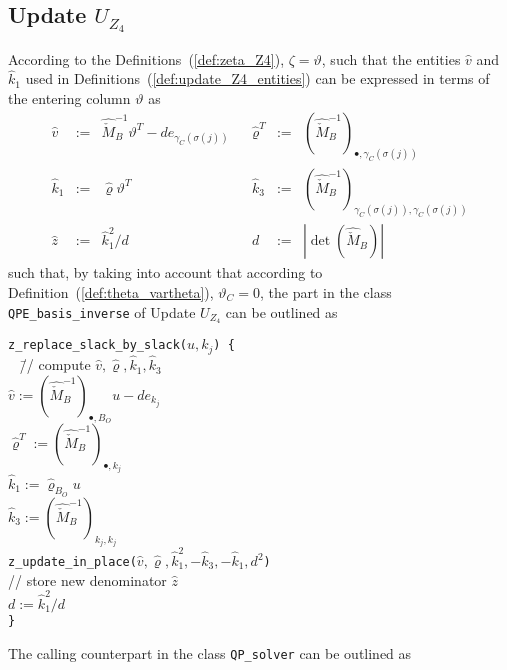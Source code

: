 \documentclass[a4paper]{article}
\begin{document}
\subsection{Update $U_{Z_{4}}$}
According to the Definitions~(\ref{def:zeta_Z4}),
$\zeta=\vartheta$, such that the entities $\hat{v}$ and $\hat{k}_{1}$ used
in Definitions~(\ref{def:update_Z4_entities}) can be expressed in terms
of the entering column $\vartheta$ as
\begin{equation}
\label{def:update_Z4_entities_prep}
\begin{array}{rclcrcl}
\hat{v}
&:=&
\hat{\check{M}}_{B}^{-1}\vartheta^{T} -de_{\gamma_{C}(\sigma(j))}
&&
\hat{\varrho}^{T}
&:=&
\left(\hat{\check{M}}_{B}^{-1}\right)_{\bullet, \gamma_{C}(\sigma(j))}
\\
\hat{k}_{1}
&:=&
\hat{\varrho}\vartheta^{T}
&&
\hat{k}_{3}
&:=&
\left(\hat{\check{M}}_{B}^{-1}\right)_{\gamma_{C}(\sigma(j)),
  \gamma_{C}(\sigma(j))}
\\
\hat{z}
&:=&
\hat{k}_{1}^{2}/d
&&
d
&:=&
\left|\det(\hat{\check{M}}_{B})\right|
\end{array}
\end{equation}
such that, by taking into account that according to
Definition~(\ref{def:theta_vartheta}), $\vartheta_{C}=0$,
the part in the class \texttt{QPE\_basis\_inverse} of
Update $U_{Z_{4}}$ can be outlined as
\begin{tabbing}
\texttt{z\_replace\_slack\_by\_slack($u, k_{j}$) \{} \\
\texttt{  } \= // compute $\hat{v}, \hat{\varrho}, \hat{k}_{1}, \hat{k}_{3}$ \\
\> \texttt{$\hat{v}:=
    \left(\hat{\check{M}}_{B}^{-1}\right)_{\bullet, B_{O}}u-de_{k_{j}}$} \\
\> \texttt{$\hat{\varrho}^{T}:=
  \left(\hat{\check{M}}_{B}^{-1}\right)_{\bullet,k_{j}}$} \\
\> \texttt{$\hat{k}_{1}:=\hat{\varrho}_{B_{O}}u$} \\
\> \texttt{$\hat{k}_{3}:=
  \left(\hat{\check{M}}_{B}^{-1}\right)_{k_{j}, k_{j}}$} \\
\> \texttt{z\_update\_in\_place($\hat{v}, \hat{\varrho}, \hat{k}_{1}^{2},
-\hat{k}_{3}, -\hat{k}_{1}, d^{2}$)} \\
\> // store new denominator $\hat{z}$ \\
\> \texttt{$d:=\hat{k}_{1}^{2}/d$} \\
\texttt{\}}
\end{tabbing}
The calling counterpart in the class \texttt{QP\_solver} can be outlined as
\end{document}

